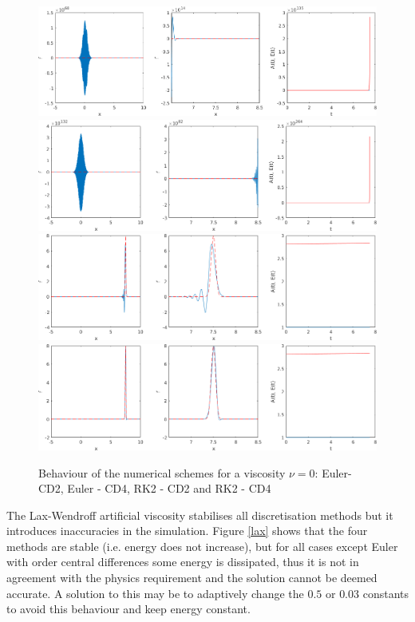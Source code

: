 \begin{figure}[!htb]
\centering
\includegraphics[scale=0.6]{./TEXT/visc01.png}
\includegraphics[scale=0.6]{./TEXT/visc02.png}
\includegraphics[scale=0.6]{./TEXT/visc03.png}
\includegraphics[scale=0.6]{./TEXT/visc04.png}
\caption{Behaviour of the numerical schemes for a viscosity $\nu = 0$:  Euler-CD2,  Euler - CD4,  RK2 - CD2 and  RK2 - CD4}
\label{visco}
\end{figure}

The Lax-Wendroff artificial viscosity stabilises all discretisation methods but it introduces inaccuracies in the simulation. Figure \ref{lax} shows that the four methods are stable (i.e. energy does not increase), but for all cases except Euler with  order central differences some energy is dissipated, thus it is not in agreement with the physics requirement and the solution cannot be deemed accurate. A solution to this may be to adaptively change the $0.5$ or $0.03$ constants to avoid this behaviour and keep energy constant. 

